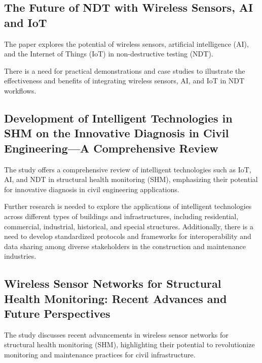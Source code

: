 \documentclass[journal, a4paper]{IEEEtran}
\begin{document}
\subsection{The Future of NDT with Wireless Sensors, AI and IoT}
The paper explores the potential of wireless sensors, artificial intelligence (AI), and the Internet of Things (IoT) in non-destructive testing (NDT). 

\begin{description}[style=standard, font=\normalfont]
  \item[Research gap:] There is a need for practical demonstrations and case studies to illustrate the effectiveness and benefits of integrating wireless sensors, AI, and IoT in NDT workflows.
\end{description}

\subsection{Development of Intelligent Technologies in SHM on the Innovative Diagnosis in Civil Engineering—A Comprehensive Review} 
The study offers a comprehensive review of intelligent technologies such as IoT, AI, and NDT in structural health monitoring (SHM), emphasizing their potential for innovative diagnosis in civil engineering applications. 

\begin{description}[style=standard, font=\normalfont]
  \item[Research gap:] Further research is needed to explore the applications of intelligent technologies across different types of buildings and infrastructures, including residential, commercial, industrial, historical, and special structures. Additionally, there is a need to develop standardized protocols and frameworks for interoperability and data sharing among diverse stakeholders in the construction and maintenance industries.
\end{description}


\subsection{Wireless Sensor Networks for Structural Health Monitoring: Recent Advances and Future Perspectives}
The study discusses recent advancements in wireless sensor networks for structural health monitoring (SHM), highlighting their potential to revolutionize monitoring and maintenance practices for civil infrastructure.
\end{document}
